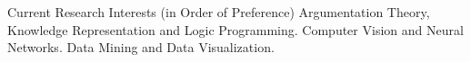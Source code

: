 \begin{rubric}{Current Research Interests (in Order of Preference)}
	Argumentation Theory, Knowledge Representation and Logic Programming.
	Computer Vision and Neural Networks.
	Data Mining and Data Visualization.

\end{rubric}
